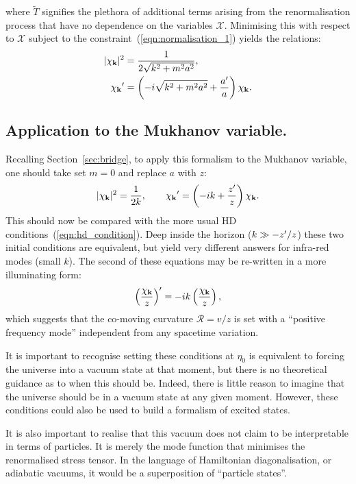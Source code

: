 where $\tilde{T}$ signifies the plethora of additional terms arising from the renormalisation process that have no dependence on the variables $\mathcal{X}$.
Minimising this with respect to $\mathcal{X}$ subject to the constraint~(\ref{eqn:normalisation_1}) yields the relations:
\begin{align}
  |\chi_{\mathbf{k}}|^2 &= \frac{1}{2\sqrt{k^2+m^2a^2}}, \\
  {{\chi_{\mathbf{k}}}^\prime} &= \left( -i \sqrt{k^2+m^2a^2} + \frac{{{a}^\prime}}{a} \right) \chi_{\mathbf{k}}.
  \label{eqn:rn_condition_m}
\end{align}


\subsection{Application to the Mukhanov variable.}
Recalling Section~\ref{sec:bridge}, to apply this formalism to the Mukhanov variable, one should take set $m=0$ and replace $a$ with $z$:
\begin{equation}        
  |\chi_{\mathbf{k}}|^2 = \frac{1}{2k},\qquad
  {{\chi_{\mathbf{k}}}^\prime} = \left( -i k + \frac{{{z}^\prime}}{z} \right) \chi_{\mathbf{k}}.
  \label{eqn:rn_condition}
\end{equation}
This should now be compared with the more usual HD conditions~(\ref{eqn:hd_condition}). Deep inside the horizon (${k\gg -{{{z}^\prime}}/{z}}$) these two initial conditions are equivalent, but yield very different answers for infra-red modes (small $k$).
The second of these equations may be re-written in a more illuminating form:
\begin{equation}
  {{\left( \frac{\chi_{\mathbf{k}}}{z} \right)}^\prime} = -i k \left( \frac{\chi_{\mathbf{k}}}{z} \right),
\end{equation}
which suggests that the co-moving curvature $\mathcal{R}=v/z$ is set with a ``positive frequency mode'' independent from any spacetime variation.

It is important to recognise setting these conditions at $\eta_0$ is equivalent to forcing the universe into a vacuum state at that moment, but there is no theoretical guidance as to when this should be. Indeed, there is little reason to imagine that the universe should be in a vacuum state at any given moment. However, these conditions could also be used to build a formalism of excited states.

It is also important to realise that this vacuum does not claim to be interpretable in terms of particles. It is merely the mode function that minimises the renormalised stress tensor. In the language of Hamiltonian diagonalisation, or adiabatic vacuums, it would be a superposition of ``particle states''.

